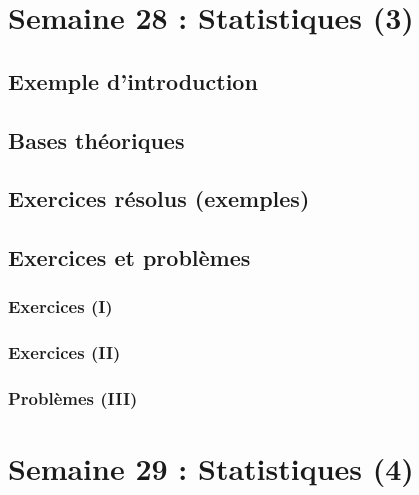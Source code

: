 \documentclass[
  12pt,
]{book}
\begin{document}
\hypertarget{semaine-28-statistiques-3}{%
\chapter{Semaine 28 : Statistiques (3)}\label{semaine-28-statistiques-3}}

\hypertarget{exemple-dintroduction-27}{%
\section{Exemple d'introduction}\label{exemple-dintroduction-27}}

\hypertarget{bases-thuxe9oriques-27}{%
\section{Bases théoriques}\label{bases-thuxe9oriques-27}}

\hypertarget{exercices-ruxe9solus-exemples-27}{%
\section{Exercices résolus (exemples)}\label{exercices-ruxe9solus-exemples-27}}

\hypertarget{exercices-et-probluxe8mes-27}{%
\section{Exercices et problèmes}\label{exercices-et-probluxe8mes-27}}

\hypertarget{exercices-i-27}{%
\subsection{Exercices (I)}\label{exercices-i-27}}

\hypertarget{exercices-ii-27}{%
\subsection{Exercices (II)}\label{exercices-ii-27}}

\hypertarget{probluxe8mes-iii-27}{%
\subsection{Problèmes (III)}\label{probluxe8mes-iii-27}}

\hypertarget{semaine-29-statistiques-4}{%
\chapter{Semaine 29 : Statistiques (4)}\label{semaine-29-statistiques-4}}
\end{document}
